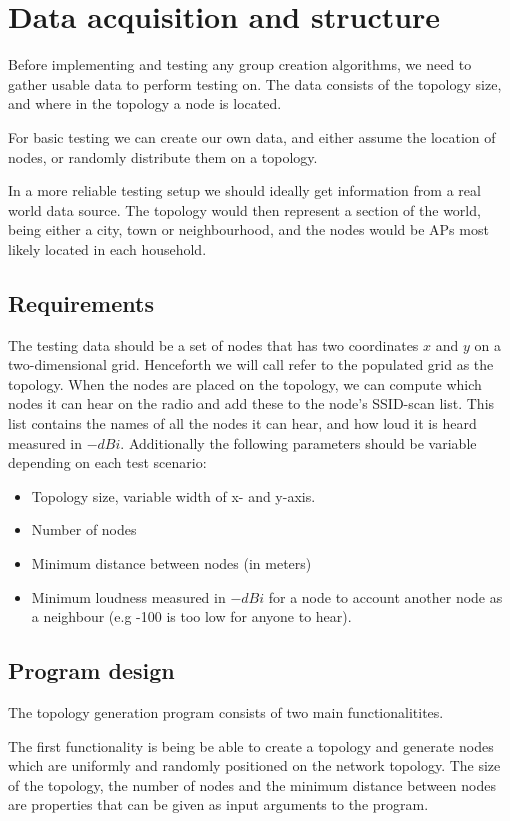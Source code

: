 \chapter{Data acquisition and structure}

Before implementing and testing any group creation algorithms, we need to gather usable data
to perform testing on. The data consists of the topology size, and where in the topology a node is located.

For basic testing we can create our own data, and either assume the location of nodes, or randomly distribute them on a topology.

In a more reliable testing setup we should ideally get information from a real world data source. 
The topology would then represent a section of the world, being either a city, town or neighbourhood, and the nodes would be APs most likely located in each household.

\section{Requirements}
The testing data should be a set of nodes that has two coordinates $x$ and $y$ on a two-dimensional grid. Henceforth we will call refer to the populated grid as the topology. When the nodes are placed on the
topology, we can compute which nodes it can hear on the radio and add these to the node's SSID-scan list.
This list contains the names of all the nodes it can hear, and how loud it is heard measured in $-dBi$.
Additionally the following parameters should be variable depending on each test scenario:
\begin{itemize}
\item Topology size, variable width of x- and y-axis.
	\item Number of nodes
\item Minimum distance between nodes (in meters)
	\item Minimum loudness measured in $-dBi$ for a node to account another node as a neighbour (e.g -100 is too low for anyone to hear).
	\end{itemize}

	\section{Program design}
	The topology generation program consists of two main functionalitites.

	The first functionality is being  be able to create a topology and generate nodes which are uniformly
	and randomly positioned on the network topology. The size of the topology, the number of nodes and the minimum distance
	between nodes are properties that can be given as input arguments to the program. 

